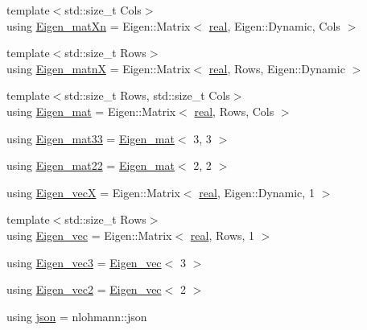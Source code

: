 \begin{DoxyCompactItemize}
\item 
{\footnotesize template$<$std\+::size\+\_\+t Cols$>$ }\\using \hyperlink{namespacetlz_ac64657248b5121a45ab176d28045b323}{Eigen\+\_\+mat\+Xn} = Eigen\+::\+Matrix$<$ \hyperlink{namespacetlz_a15fd37cce97f2b8b606af18c2615f602}{real}, Eigen\+::\+Dynamic, Cols $>$
\item 
{\footnotesize template$<$std\+::size\+\_\+t Rows$>$ }\\using \hyperlink{namespacetlz_a103ecb11ac4d0ca5c9acecd23adf1c4b}{Eigen\+\_\+matnX} = Eigen\+::\+Matrix$<$ \hyperlink{namespacetlz_a15fd37cce97f2b8b606af18c2615f602}{real}, Rows, Eigen\+::\+Dynamic $>$
\item 
{\footnotesize template$<$std\+::size\+\_\+t Rows, std\+::size\+\_\+t Cols$>$ }\\using \hyperlink{namespacetlz_a524ba0d1429b56ff27b8f86c218f9dff}{Eigen\+\_\+mat} = Eigen\+::\+Matrix$<$ \hyperlink{namespacetlz_a15fd37cce97f2b8b606af18c2615f602}{real}, Rows, Cols $>$
\item 
using \hyperlink{namespacetlz_afee79ad04dc384cb36b98f258f24d8cd}{Eigen\+\_\+mat33} = \hyperlink{namespacetlz_a524ba0d1429b56ff27b8f86c218f9dff}{Eigen\+\_\+mat}$<$ 3, 3 $>$
\item 
using \hyperlink{namespacetlz_adf3b774ce3c9b66055cfa9ca2aca5bbd}{Eigen\+\_\+mat22} = \hyperlink{namespacetlz_a524ba0d1429b56ff27b8f86c218f9dff}{Eigen\+\_\+mat}$<$ 2, 2 $>$
\item 
using \hyperlink{namespacetlz_aab627ce949ee3307a5bef93980c4a8df}{Eigen\+\_\+vecX} = Eigen\+::\+Matrix$<$ \hyperlink{namespacetlz_a15fd37cce97f2b8b606af18c2615f602}{real}, Eigen\+::\+Dynamic, 1 $>$
\item 
{\footnotesize template$<$std\+::size\+\_\+t Rows$>$ }\\using \hyperlink{namespacetlz_a2956723eeab1e0b07f733e404d96e20e}{Eigen\+\_\+vec} = Eigen\+::\+Matrix$<$ \hyperlink{namespacetlz_a15fd37cce97f2b8b606af18c2615f602}{real}, Rows, 1 $>$
\item 
using \hyperlink{namespacetlz_a0d9cceede7be35e19a7173494ca6fb91}{Eigen\+\_\+vec3} = \hyperlink{namespacetlz_a2956723eeab1e0b07f733e404d96e20e}{Eigen\+\_\+vec}$<$ 3 $>$
\item 
using \hyperlink{namespacetlz_a3c87ebfa36baeec6f6b28dd9f3911556}{Eigen\+\_\+vec2} = \hyperlink{namespacetlz_a2956723eeab1e0b07f733e404d96e20e}{Eigen\+\_\+vec}$<$ 2 $>$
\item 
using \hyperlink{namespacetlz_ac400657dfcddf6309a769aefc23eed0c}{json} = nlohmann\+::json

\end{DoxyCompactItemize}
